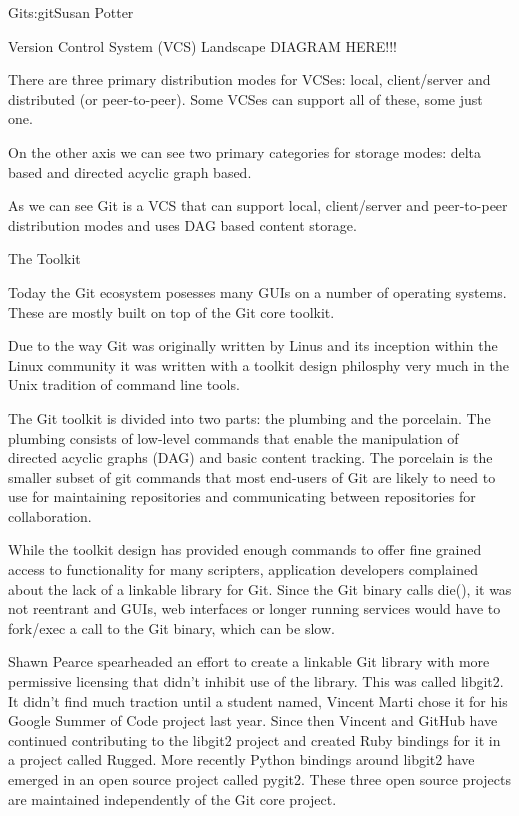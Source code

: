 \begin{aosachapter}{Git}{s:git}{Susan Potter}
\begin{aosasect1}{Version Control System (VCS) Landscape}
DIAGRAM HERE!!!

There are three primary distribution modes for VCSes: local, client/server
and distributed (or peer-to-peer). Some VCSes can support all of these, some
just one.

On the other axis we can see two primary categories for storage modes:
delta based and directed acyclic graph based.

As we can see Git is a VCS that can support local, client/server and
peer-to-peer distribution modes and uses DAG based content storage.

\end{aosasect1}


\begin{aosasect1}{The Toolkit}

Today the Git ecosystem posesses many GUIs on a number of operating systems.
These are mostly built on top of the Git core toolkit.

Due to the way Git was originally written by Linus and its inception within
the Linux community it was written with a toolkit design philosphy very much
in the Unix tradition of command line tools.

The Git toolkit is divided into two parts: the plumbing and
the porcelain. The plumbing consists of low-level commands that enable
the manipulation of directed acyclic graphs (DAG) and basic content
tracking. The porcelain is the smaller subset of git commands that most
end-users of Git are likely to need to use for maintaining repositories and
communicating between repositories for collaboration.

While the toolkit design has provided enough commands to offer fine grained
access to functionality for many scripters, application developers
complained about the lack of a linkable library for Git. Since the Git binary
calls die(), it was not reentrant and GUIs, web interfaces or longer running
services would have to fork/exec a call to the Git binary, which can be slow.

Shawn Pearce spearheaded an effort to create a linkable Git library with
more permissive licensing that didn't inhibit use of the library. This was
called libgit2. It didn't find much traction until a student named, Vincent
Marti chose it for his Google Summer of Code project last year. Since then
Vincent and GitHub have continued contributing to the libgit2 project and
created Ruby bindings for it in a project called Rugged. More recently
Python bindings around libgit2 have emerged in an open source project
called pygit2. These three open source projects are maintained independently
of the Git core project.


\end{aosasect1}
\end{aosachapter}
